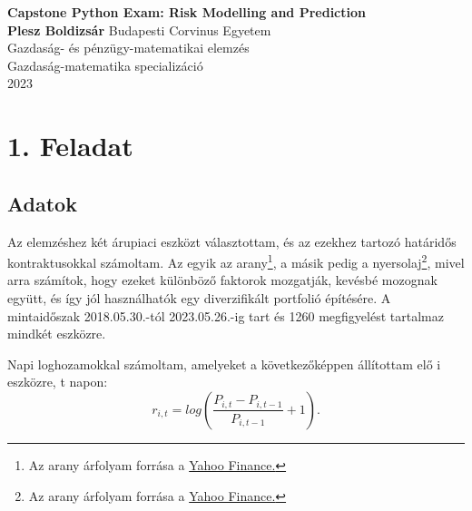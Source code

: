 \documentclass[a4paper,12pt]{article}
\begin{document}
\begin{titlepage}

   \begin{center}
       \vspace*{1cm}
        \textbf{\Large Capstone Python Exam: Risk Modelling and Prediction} \\
       \vspace{0.5cm}
       \vspace{1.5cm}
       \textbf{Plesz Boldizsár}
       \vfill
       Budapesti Corvinus Egyetem\\
       Gazdaság- és pénzügy-matematikai elemzés\\
       Gazdaság-matematika specializáció \\
       2023 \\
	
    \end{center}
\end{titlepage}

\newpage
\tableofcontents

\section{1. Feladat}
\subsection{Adatok}
Az elemzéshez két árupiaci eszközt választottam, és az ezekhez tartozó határidős kontraktusokkal számoltam. 
Az egyik az arany\footnote{Az arany árfolyam forrása a  
\href{https://finance.yahoo.com/quote/GC\%3DF/history?period1=1527638400&period2=1685404800&interval=1d&filter=history&frequency=1d&includeAdjustedClose=true}{Yahoo Finance.}
}, a másik pedig a nyersolaj\footnote{Az arany árfolyam forrása a  
\href{https://finance.yahoo.com/quote/CL\%3DF/history?period1=1527638400&period2=1685404800&interval=1d&filter=history&frequency=1d&includeAdjustedClose=true}{Yahoo Finance.}
}, mivel arra számítok, hogy ezeket különböző faktorok mozgatják, kevésbé mozognak együtt, és így jól használhatók egy diverzifikált portfolió építésére. 
A mintaidőszak 2018.05.30.-tól 2023.05.26.-ig tart és 1260 megfigyelést tartalmaz mindkét eszközre. 

Napi loghozamokkal számoltam, amelyeket a következőképpen állítottam elő i eszközre, t napon:
\begin{equation}
r_{i,t}=log(\frac{P_{i,t}-P_{i,t-1}}{P_{i,t-1}} + 1).
\end{equation}
\end{document}
